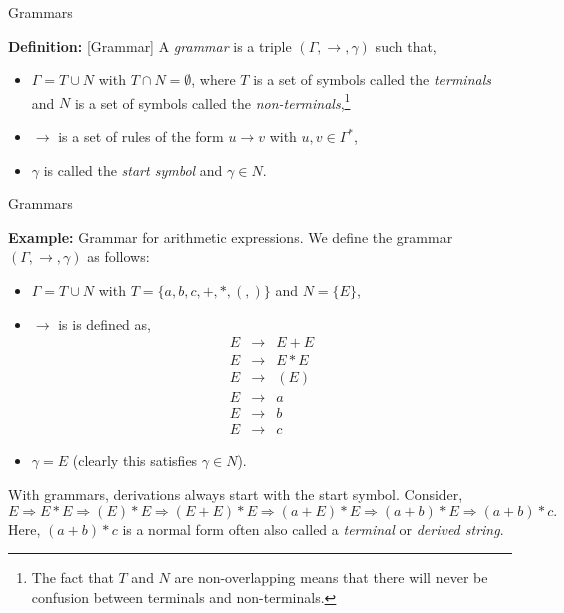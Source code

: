 \documentclass{beamer}
\begin{document}
\begin{frame}[fragile]{Grammars}

\small

{\bf Definition:} [Grammar] A {\em grammar} is a triple $(\Gamma,\rightarrow,\gamma)$ such that,
\begin{itemize}
\item $\Gamma = T \cup N$ with $T\cap N = \emptyset$, where $T$ is a set of symbols called the {\em terminals} and $N$ is a set of symbols
called the {\em non-terminals},\footnote{The fact that $T$ and $N$ are non-overlapping means
that there will never be confusion between terminals and non-terminals.}
\item $\rightarrow$ is a set of rules of the form $u \rightarrow v$ with $u,v\in\Gamma^*$,
\item $\gamma$ is called the {\em start symbol} and $\gamma\in N$.
\end{itemize}
\end{frame}

\begin{frame}[fragile]{Grammars}

\small
{\bf Example:} Grammar for arithmetic expressions.  We define the grammar $(\Gamma, \rightarrow, \gamma)$ as follows:
\begin{itemize}
\item $\Gamma = T \cup N$ with $T = \{ a, b, c, +, *, (, )\}$ and $N=\{ E \}$,
\item $\rightarrow$ is is defined as,
{\scriptsize
\[
\begin{array}{rcl}
E & \rightarrow & E + E \\
E & \rightarrow & E * E \\
E & \rightarrow & ( E )\\
E & \rightarrow & a\\
E & \rightarrow & b\\
E & \rightarrow & c
\end{array}
\]
}
\item $\gamma = E$ (clearly this satisfies $\gamma\in N$).
\end{itemize}
With grammars, derivations always start with the start symbol. Consider,
\[
E\Rightarrow E * E \Rightarrow ( E ) * E \Rightarrow ( E + E ) * E \Rightarrow (a + E) * E \Rightarrow (a + b) * E
\Rightarrow (a + b) * c.
\]
Here, $(a+b)*c$ is a normal form often also called a {\em terminal} or {\em derived string}.

\end{frame}
\end{document}
